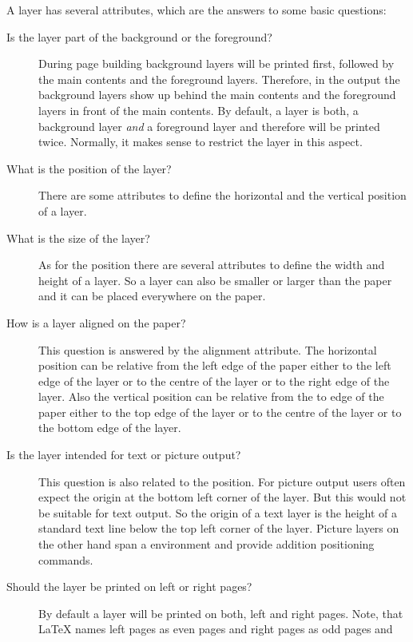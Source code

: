 A layer has several attributes, which are the answers to some basic questions:
\begin{description}
\item[Is the layer part of the background or the
  foreground?]%
  During page building background layers will be printed first, followed by
  the main contents and the foreground layers. Therefore, in the output the
  background layers show up behind the main contents and the foreground layers
  in front of the main contents. By default, a layer is both, a background
  layer \emph{and} a foreground layer and therefore will be printed
  twice. Normally, it makes sense to restrict the layer in this aspect.
\item[What is the position of the layer?]%
  There are some attributes to define the horizontal and the vertical position
  of a layer.
\item[What is the size of the layer?]%
  As for the position there are several attributes to define the width and
  height of a layer. So a layer can also be smaller or larger than the paper
  and it can be placed everywhere on the paper.
\item[How is a layer aligned on the paper?]%
  This question is answered by the alignment attribute. The horizontal position
  can be relative from the left edge of the paper either to the left edge of
  the layer or to the centre of the layer or to the right edge of the
  layer. Also the vertical position can be relative from the to edge of the
  paper either to the top edge of the layer or to the centre of the layer or
  to the bottom edge of the layer.
\item[Is the layer intended for text or picture output?]%
  This question is also related to the position. For picture output users
  often expect the origin at the bottom left corner of the layer. But this
  would not be suitable for text output. So the origin of a text layer is the
  height of a standard text line below the top left corner of the
  layer. Picture layers on the other hand span a
   environment and provide addition
  positioning commands.
\item[Should the layer be printed on left or right pages?]%
  By default a layer will be printed on both, left and right pages. Note, that
  \LaTeX{} names left pages as even pages and right pages as odd pages and

\end{description}
